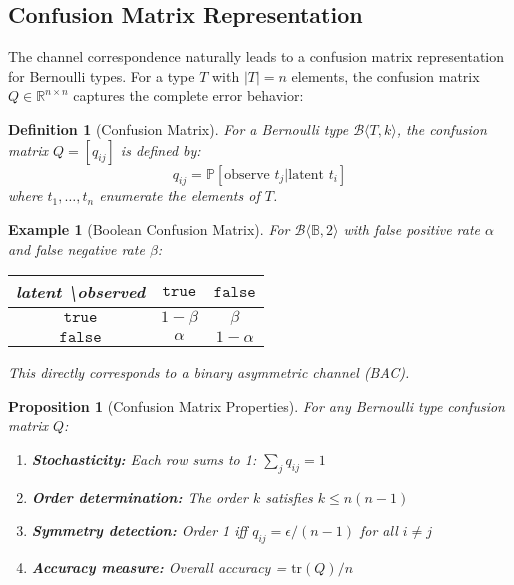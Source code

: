 \documentclass[11pt,final,hidelinks]{article}
\newtheorem{proposition}[theorem]{Proposition}
\newtheorem{definition}[theorem]{Definition}
\newtheorem{example}[theorem]{Example}
\newcommand{\bernoulli}[2]{\mathcal{B}\langle #1, #2 \rangle}
\newcommand{\Bool}{\mathbb{B}}
\newcommand{\Prob}[1]{\mathbb{P}\left[#1\right]}
\begin{document}


\subsection{Confusion Matrix Representation}

The channel correspondence naturally leads to a confusion matrix representation for Bernoulli types. For a type $T$ with $|T| = n$ elements, the confusion matrix $Q \in \mathbb{R}^{n \times n}$ captures the complete error behavior:

\begin{definition}[Confusion Matrix]
For a Bernoulli type $\bernoulli{T}{k}$, the confusion matrix $Q = [q_{ij}]$ is defined by:
\begin{equation}
q_{ij} = \Prob{\text{observe } t_j | \text{latent } t_i}
\end{equation}
where $t_1, \ldots, t_n$ enumerate the elements of $T$.
\end{definition}

\begin{example}[Boolean Confusion Matrix]
For $\bernoulli{\Bool}{2}$ with false positive rate $\alpha$ and false negative rate $\beta$:

\begin{center}
\begin{tabular}{c|cc}
latent \textbackslash observed & $\mathtt{true}$ & $\mathtt{false}$ \\
\hline
$\mathtt{true}$ & $1-\beta$ & $\beta$ \\
$\mathtt{false}$ & $\alpha$ & $1-\alpha$
\end{tabular}
\end{center}

This directly corresponds to a binary asymmetric channel (BAC).
\end{example}

\begin{proposition}[Confusion Matrix Properties]
For any Bernoulli type confusion matrix $Q$:
\begin{enumerate}
    \item \textbf{Stochasticity:} Each row sums to 1: $\sum_j q_{ij} = 1$
    \item \textbf{Order determination:} The order $k$ satisfies $k \leq n(n-1)$
    \item \textbf{Symmetry detection:} Order 1 iff $q_{ij} = \epsilon/(n-1)$ for all $i \neq j$
    \item \textbf{Accuracy measure:} Overall accuracy = $\text{tr}(Q)/n$
\end{enumerate}
\end{proposition}
\end{document}
